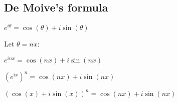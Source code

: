
\subsection{De Moive's formula}

\(e^{i\theta }=\cos (\theta )+i\sin (\theta )\)

Let \(\theta = nx\):

\(e^{inx }=\cos (nx )+i\sin (nx )\)

\((e^{ix})^n=\cos (nx )+i\sin (nx )\)

\((\cos (x)+i\sin (x))^n=\cos (nx )+i\sin (nx )\)

